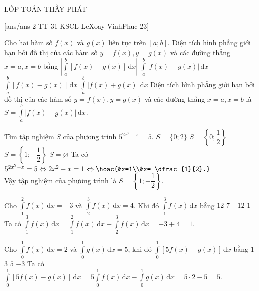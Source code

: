 \begin{name}
	{\tenchude}{\tendethi}{LỚP TOÁN THẦY PHÁT}{\thoigian}
\end{name}
\setcounter{ex}{0}\setcounter{bt}{0}
[ans/ans-2-TT-31-KSCL-LeXoay-VinhPhuc-23]
\begin{ex}%
Cho hai hàm số $f(x)$ và $g(x)$ liên tục trên $[a;b]$. Diện tích hình phẳng giới hạn bởi đồ thị của các hàm số $y=f(x),y=g(x)$ và các đường thẳng $x=a,x=b$ bằng
\choice
{$\left|\displaystyle\int\limits_a^b[f(x)-g(x)]\mathrm{\, d}x\right|$}
{\True $\displaystyle\int\limits_a^b|f(x)-g(x)|\mathrm{\, d}x$}
{$\displaystyle\int\limits_a^b[f(x)-g(x)]\mathrm{\, d}x$}
{$\displaystyle\int\limits_a^b|f(x)+g(x)|\mathrm{\, d}x$}
\loigiai
{
Diện tích hình phẳng giới hạn bởi đồ thị của các hàm số $y=f(x),y=g(x)$ và các đường thẳng $x=a,x=b$ là $S=\displaystyle\int\limits_a^b\left|f(x)-g(x)\right|\mathrm{\, d}x$.
}
\end{ex}

\begin{ex}%
Tìm tập nghiệm $S$ của phương trình $5^{2x^2-x}=5$.
\choice
{$S=\{0;2\}$}
{$S=\left\{0;\dfrac{1}{2}\right\}$}
{\True $S=\left\{1;-\dfrac{1}{2}\right\}$}
{$S=\varnothing$}
\loigiai
{
Ta có $5^{2x^2-x}=5 \Leftrightarrow 2x^2-x=1 \Leftrightarrow \hoac{&x=1\\&x=-\dfrac{1}{2}.}$\\
Vậy tập nghiệm của phương trình là $S=\left\{1;-\dfrac{1}{2}\right\}$.
}
\end{ex}

\begin{ex}%
Cho $\displaystyle\int\limits_1^2f(x)\mathrm{\, d}x=-3$ và $\displaystyle\int\limits_2^3f(x)\mathrm{\, d}x=4$. Khi đó $\displaystyle\int\limits_1^3f(x)\mathrm{\, d}x$ bằng
\choice
{$12$}
{$7$}
{$-12$}
{\True $1$}
\loigiai
{
Ta có $\displaystyle\int\limits_1^3f(x)\mathrm{\, d}x=\displaystyle\int\limits_1^2f(x)\mathrm{\, d}x+\displaystyle\int\limits_2^3f(x)\mathrm{\, d}x=-3+4=1$.
}
\end{ex}

\begin{ex}%
Cho $\displaystyle\int\limits_0^1f(x)\mathrm{\, d}x=2$ và $\displaystyle\int\limits_0^1g(x)\mathrm{\, d}x=5$, khi đó $\displaystyle\int\limits_0^1[5f(x)-g(x)]\mathrm{\, d}x$ bằng
\choice
{$1$}
{$3$}
{\True $5$}
{$-3$}
\loigiai
{
Ta có $\displaystyle\int\limits_0^1[5f(x)-g(x)]\mathrm{\, d}x=5\displaystyle\int\limits_0^1f(x)\mathrm{\, d}x-\displaystyle\int\limits_0^1g(x)\mathrm{\, d}x=5\cdot2-5=5$.
}
\end{ex}

